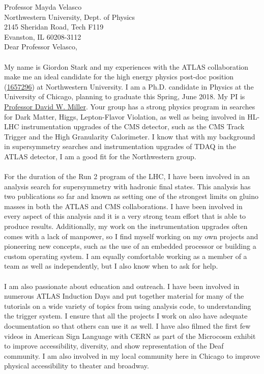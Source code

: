 \documentclass[11pt,letter]{article}
\begin{document}
\thispagestyle{fancy}

Professor Mayda Velasco \\
Northwestern University, Dept. of Physics \\
2145 Sheridan Road, Tech F119 \\
Evanston, IL 60208-3112 \\[0.5cm]

Dear Professor Velasco, \\
\\
My name is Giordon Stark and my experiences with the ATLAS collaboration make me an ideal candidate for the high energy physics post-doc position (\href{https://inspirehep.net/record/1657296}{1657296}) at Northwestern University. I am a Ph.D. candidate in Physics at the University of Chicago, planning to graduate this Spring, June 2018. My PI is \href{http://hep.uchicago.edu/~DavidMiller/Welcome.html}{Professor David W. Miller}. Your group has a strong physics program in searches for Dark Matter, Higgs, Lepton-Flavor Violation, as well as being involved in HL-LHC instrumentation upgrades of the CMS detector, such as the CMS Track Trigger and the High Granularity Calorimeter. I know that with my background in supersymmetry searches and instrumentation upgrades of TDAQ in the ATLAS detector, I am a good fit for the Northwestern group.\\
\\
For the duration of the Run 2 program of the LHC, I have been involved in an analysis search for supersymmetry with hadronic final states. This analysis has two publications so far and known as setting one of the strongest limits on gluino masses in both the ATLAS and CMS collaborations. I have been involved in every aspect of this analysis and it is a very strong team effort that is able to produce results. Additionally, my work on the instrumentation upgrades often comes with a lack of manpower, so I find myself working on my own projects and pioneering new concepts, such as the use of an embedded processor or building a custom operating system. I am equally comfortable working as a member of a team as well as independently, but I also know when to ask for help.\\
\\
I am also passionate about education and outreach. I have been involved in numerous ATLAS Induction Days and put together material for many of the tutorials on a wide variety of topics from using analysis code, to understanding the trigger system. I ensure that all the projects I work on also have adequate documentation so that others can use it as well. I have also filmed the first few videos in American Sign Language with CERN as part of the Microcosm exhibit to improve accessibility, diversity, and show representation of the Deaf community. I am also involved in my local community here in Chicago to improve physical accessibility to theater and broadway. \\
\end{document}
